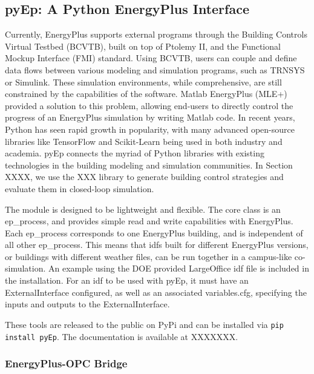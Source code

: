 \subsection{pyEp: A Python EnergyPlus Interface}

Currently, EnergyPlus supports external programs through the Building Controls Virtual Testbed (BCVTB), built on top of Ptolemy II, and the Functional Mockup Interface (FMI) standard. Using BCVTB, users can couple and define data flows between various modeling and simulation programs, such as TRNSYS or Simulink. These simulation environments, while comprehensive, are still constrained by the capabilities of the software. Matlab EnergyPlus (MLE+) provided a solution to this problem, allowing end-users to directly control the progress of an EnergyPlus simulation by writing Matlab code. In recent years, Python has seen rapid growth in popularity, with many advanced open-source libraries like TensorFlow and Scikit-Learn being used in both industry and academia. pyEp connects the myriad of Python libraries with existing technologies in the building modeling and simulation communities. In Section XXXX, we use the XXX library to generate building control strategies and evaluate them in closed-loop simulation.

The module is designed to be lightweight and flexible. The core class is an ep\_process, and provides simple read and write capabilities with EnergyPlus. Each ep\_process corresponds to one EnergyPlus building, and is independent of all other ep\_process. This means that idfs built for different EnergyPlus versions, or buildings with different weather files, can be run together in a campus-like co-simulation. An example using the DOE provided LargeOffice idf file is included in the installation. For an idf to be used with pyEp, it must have an ExternalInterface configured, as well as an associated variables.cfg, specifying the inputs and outputs to the ExternalInterface.

These tools are released to the public on PyPi and can be installed via 
\texttt{pip install pyEp}. The documentation is available at XXXXXXX.

\subsubsection{EnergyPlus-OPC Bridge}

